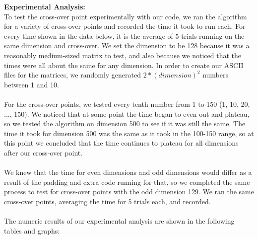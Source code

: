 \documentclass[11pt]{article}
\begin{document}
\textbf{Experimental Analysis:} \\
To test the cross-over point experimentally with our code, we ran the algorithm for a variety of cross-over points and recorded the time it took to run each. For every time shown in the data below, it is the average of 5 trials running on the same dimension and cross-over. We set the dimension to be 128 because it was a reasonably medium-sized matrix to test, and also because we noticed that the times were all about the same for any dimension. In order to create our ASCII files for the matrices, we randomly generated $2*(dimension)^2$ numbers between 1 and 10. \\\\
For the cross-over points, we tested every tenth number from 1 to 150 (1, 10, 20, ..., 150). We noticed that at some point the time began to even out and plateau, so we tested the algorithm on dimension 500 to see if it was still the same. The time it took for dimension 500 was the same as it took in the 100-150 range, so at this point we concluded that the time continues to plateau for all dimensions after our cross-over point. \\\\
We knew that the time for even dimensions and odd dimensions would differ as a result of the padding and extra code running for that, so we completed the same process to test for cross-over points with the odd dimension 129. We ran the same cross-over points, averaging the time for 5 trials each, and recorded. \\\\
The numeric results of our experimental analysis are shown in the following tables and graphs: \\\\\\\\\\\\\\\\\\\\
\end{document}
